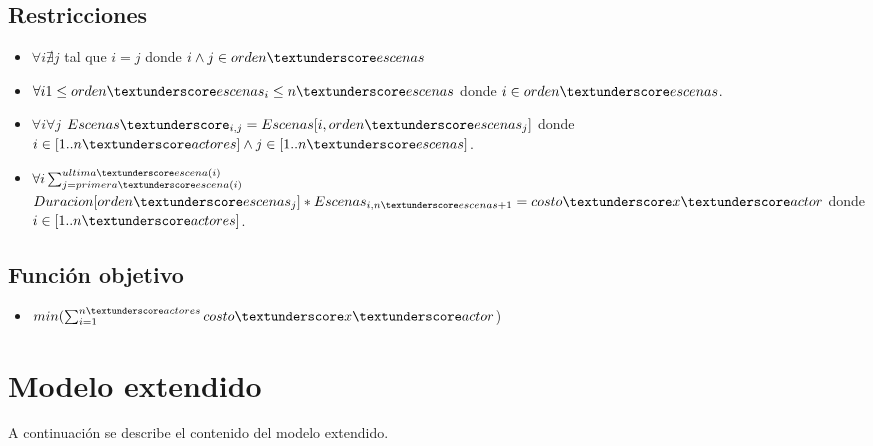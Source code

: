 \documentclass{article}
\begin{document}
\subsection{Restricciones}
\begin{itemize}
    \item $\forall i \nexists j$ tal que $i = j$ \newline donde $i \land j \in orden\textunderscore escenas$
    \item $\forall i 1 \leq orden\textunderscore escenas_i \leq n\textunderscore escenas$  donde $i \in orden\textunderscore escenas$.
    \item $\forall i \forall j$  $Escenas\textunderscore_{i,j} = Escenas[i,orden\textunderscore escenas_{j}]$ \newline donde $i \in [1..n\textunderscore actores] \land j \in [1..n\textunderscore escenas]$.
    \item $\forall i\sum_{j=primera\textunderscore escena(i)}^{ultima\textunderscore escena(i)}$  $Duracion[orden\textunderscore escenas_j] * Escenas_{i,n\textunderscore escenas+1} = costo\textunderscore x\textunderscore actor$\newline
          donde $i \in [1..n\textunderscore actores]$.
\end{itemize}

\subsection{Función objetivo}
\begin{itemize}
    \item $min(\sum_{i=1}^{n\textunderscore actores}costo\textunderscore x\textunderscore actor$)
\end{itemize}

\section{Modelo extendido}
A continuación se describe el contenido del modelo extendido. \newline
\end{document}
